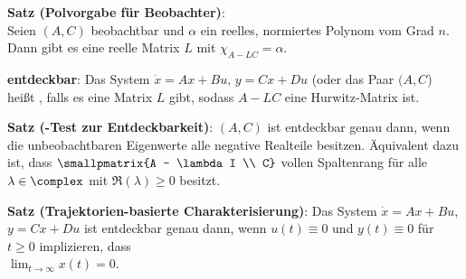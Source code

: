 \textbf{Satz (Polvorgabe für Beobachter)}:\\
Seien $(A, C)$ beobachtbar und $\alpha$ ein reelles, normiertes
Polynom vom Grad $n$.\\
Dann gibt es eine reelle Matrix $L$ mit $\chi_{A - LC} = \alpha$.

\linie

\textbf{entdeckbar}:
Das System $\dot{x} = Ax + Bu$, $y = Cx + Du$ (oder das Paar $(A, C$) heißt
,
falls es eine Matrix $L$ gibt, sodass $A - LC$ eine Hurwitz-Matrix ist.

\textbf{Satz (-Test zur Entdeckbarkeit)}:
$(A, C)$ ist entdeckbar genau dann, wenn
die unbeobachtbaren Eigenwerte alle negative Realteile besitzen.
Äquivalent dazu ist, dass $\smallpmatrix{A - \lambda I \\ C}$ vollen Spaltenrang für alle
$\lambda \in \complex$ mit $\Re(\lambda) \ge 0$ besitzt.

\textbf{Satz (Trajektorien-basierte Charakterisierung)}:
Das System $\dot{x} = Ax + Bu$, $y = Cx + Du$ ist entdeckbar genau dann, wenn
$u(t) \equiv 0$ und $y(t) \equiv 0$ für $t \ge 0$ implizieren, dass\\
$\lim_{t \to \infty} x(t) = 0$.

